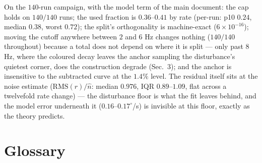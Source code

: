 \documentclass[10pt]{article}
\newcommand{\rms}{\mathrm{RMS}}
\begin{document}
On the $140$-run campaign, with the model term of the main document:
the cap holds on $140/140$ runs; the used fraction is
$0.36$--$0.41$ by rate (per-run: p10 $0.24$, median $0.38$, worst
$0.72$); the split's orthogonality is machine-exact ($6\times
10^{-16}$); moving the cutoff anywhere between $2$ and $6$ Hz changes nothing
($140/140$ throughout) because a total does not depend on where it is
split --- only past $8$ Hz, where the coloured decay leaves the
anchor sampling the disturbance's quietest corner, does the
construction degrade (Sec.~3); and the anchor is insensitive
to the subtracted curve at the $1.4\%$ level. The residual itself
sits at the noise estimate ($\rms(r)/\hat n$: median $0.976$, IQR
$0.89$--$1.09$, flat across a twelvefold rate change) --- the
disturbance floor is what the fit leaves behind, and the model error
underneath it ($0.16$--$0.17^\circ$/s) is invisible at this floor,
exactly as the theory predicts.

\section*{Glossary}
\end{document}
